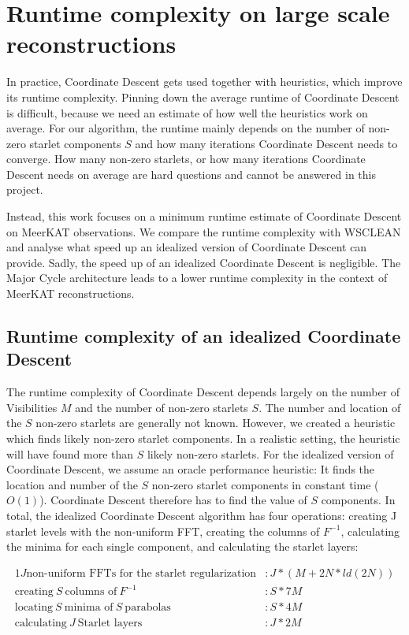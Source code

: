 \section{Runtime complexity on large scale reconstructions}
In practice, Coordinate Descent gets used together with heuristics, which improve its runtime complexity. Pinning down the average runtime of Coordinate Descent is difficult, because we need an estimate of how well the heuristics work on average. For our algorithm, the runtime mainly depends on the number of non-zero starlet components $S$ and how many iterations Coordinate Descent needs to converge. How many non-zero starlets, or how many iterations Coordinate Descent needs on average are hard questions and cannot be answered in this project.

Instead, this work focuses on a minimum runtime estimate of Coordinate Descent on MeerKAT observations. We compare the runtime complexity with WSCLEAN and analyse what speed up an idealized version of Coordinate Descent can provide. Sadly, the speed up of an idealized Coordinate Descent is negligible. The Major Cycle architecture leads to a lower runtime complexity in the context of MeerKAT reconstructions.


\subsection{Runtime complexity of an idealized Coordinate Descent}
The runtime complexity of Coordinate Descent depends largely on the number of Visibilities $M$ and the number of non-zero starlets $S$. The number and location of the $S$ non-zero starlets are generally not known. However, we created a heuristic which finds likely non-zero starlet components. In a realistic setting, the heuristic will have found more than $S$ likely non-zero starlets. For the idealized version of Coordinate Descent, we assume an oracle performance heuristic: It finds the location and number of the $S$ non-zero starlet components in constant time ($O(1)$). Coordinate Descent therefore has to find the value of $S$  components. In total, the idealized Coordinate Descent algorithm has four operations: creating J starlet levels with the non-uniform FFT, creating the columns of $F^{-1}$, calculating the minima for each single component, and calculating the starlet layers:

\begin{alignat*}{1}
J \text{non-uniform FFTs for the starlet regularization} &: J*(M + 2N*ld(2N))\\
\text{creating} \:S\: \text{columns of}\: F^{-1} &: S*7M\\
\text{locating} \:S\: \text{minima of} \:S\: \text{parabolas} &: S*4M\\
\text{calculating} \:J\: \text{Starlet layers} &: J * 2M
\end{alignat*}

